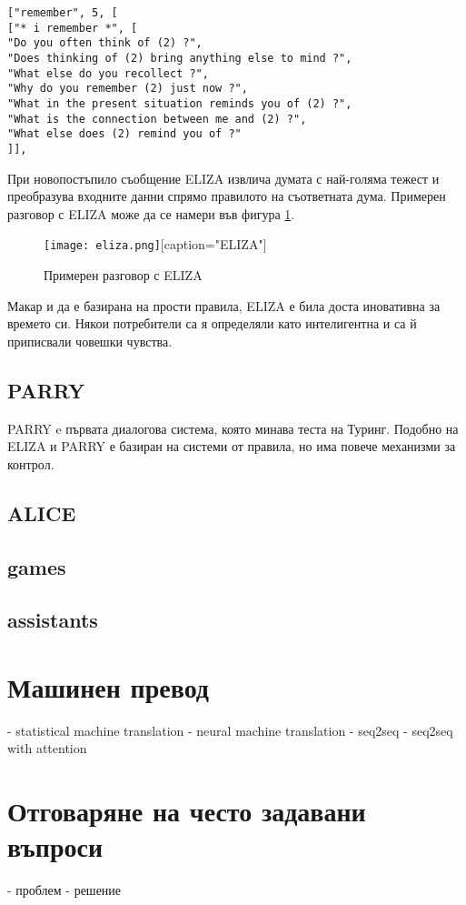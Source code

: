 \begin{verbatim}
["remember", 5, [
["* i remember *", [
"Do you often think of (2) ?",
"Does thinking of (2) bring anything else to mind ?",
"What else do you recollect ?",
"Why do you remember (2) just now ?",
"What in the present situation reminds you of (2) ?",
"What is the connection between me and (2) ?",
"What else does (2) remind you of ?"
]],
\end{verbatim}

При новопостъпило съобщение ELIZA извлича думата с най-голяма тежест и преобразува входните данни спрямо правилото на съответната дума. Примерен разговор с ELIZA може да се намери във фигура \ref{eliza-image}.
\begin{figure}
	\caption{Примерен разговор с ELIZA}
	\label{eliza-image}
	\texttt{[image: eliza.png]}[caption="ELIZA"] 
\end{figure}

Макар и да е базирана на прости правила, ELIZA е била доста иновативна за времето си. Някои потребители са я определяли като интелигентна и са й приписвали човешки чувства. 
\subsection{PARRY}
PARRY e първата диалогова система, която минава теста на Туринг\cite{turing}. Подобно на ELIZA и PARRY е базиран на системи от правила, но има повече механизми за контрол.
\subsection{ALICE}
\subsection{games}

\subsection{assistants}

\section{Машинен превод}
- statistical machine translation
- neural machine translation
- seq2seq
- seq2seq with attention

\section{Отговаряне на често задавани въпроси}
- проблем
- решение

